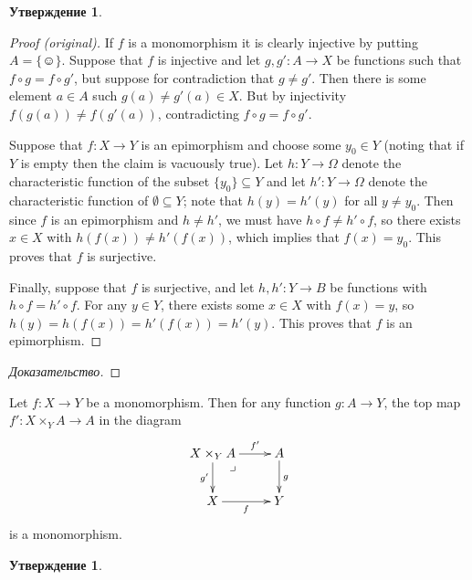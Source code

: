 \documentclass[a4paper]{book}
\makeatletter
\def\singleton{\{\smiley\}}
\def\to{\rightarrow}
\def\taking{\colon}
\def\ss{\subseteq}
\def\ullimit{\ar@{}[rd]|(.3)*+{\lrcorner}}
\theoremstyle{myth}
\newtheorem{propositionENG}[envENG]{\begin{english}Proposition\end{english}}
\newenvironment{proofENG}{\begin{proof}[Proof (original)]}{\end{proof}}
\newtheorem{propositionRUS}[envRUS]{Утверждение}
\newenvironment{proofRUS}{\begin{proof}[Доказательство]}{\end{proof}}
\makeatother
\begin{document}
\begin{russian}
\begin{propositionRUS}
\end{propositionRUS}

\begin{proofENG}
If $f$ is a monomorphism it is clearly injective by putting $A=\singleton$. Suppose that $f$ is injective and let $g,g'\taking A\to X$ be functions such that $f\circ g=f\circ g'$, but suppose for contradiction that $g\neq g'$. Then there is some element $a\in A$ such $g(a)\neq g'(a)\in X$. But by injectivity $f(g(a))\neq f(g'(a))$, contradicting $f\circ g=f\circ g'$.

Suppose that $f\taking X\to Y$ is an epimorphism and choose some $y_0\in Y$ (noting that if $Y$ is empty then the claim is vacuously true). Let $h\taking Y\to\Omega$ denote the characteristic function of the subset $\{y_0\}\ss Y$ and let $h'\taking Y\to\Omega$ denote the characteristic function of $\emptyset\ss Y$; note that $h(y)=h'(y)$ for all $y\neq y_0$. Then since $f$ is an epimorphism and $h\neq h'$, we must have $h\circ f\neq h'\circ f$, so there exists $x\in X$ with $h(f(x))\neq h'(f(x))$, which implies that $f(x)=y_0$. This proves that $f$ is surjective.

Finally, suppose that $f$ is surjective, and let $h,h'\taking Y\to B$ be functions with $h\circ f=h'\circ f$. For any $y\in Y$, there exists some $x\in X$ with $f(x)=y$, so $h(y)=h(f(x))=h'(f(x))=h'(y)$. This proves that $f$ is an epimorphism.
\end{proofENG}

\begin{proofRUS}
 
\end{proofRUS}

\begin{propositionENG}\label{prop:pb preserve mono}
Let $f\taking X\to Y$ be a monomorphism. Then for any function $g\taking A\to Y$, the top map $f'\taking X\times_YA\to A$ in the diagram
$$
\xymatrix{X\times_YA\ar[r]^-{f'}\ar[d]_{g'}\ullimit&A\ar[d]^g\\X\ar[r]_f&Y}
$$
is a monomorphism.
\end{propositionENG}

\begin{propositionRUS}\label{prop:pb preserve mono}
 
\end{propositionRUS}


\end{russian}
\end{document}
